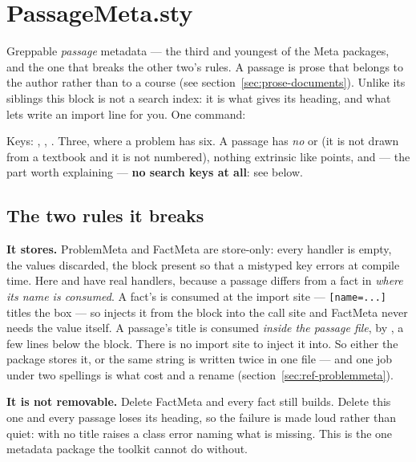 \section{PassageMeta.sty}\label{sec:ref-passagemeta}

Greppable \emph{passage} metadata --- the third and youngest of the Meta
packages, and the one that breaks the other two's rules. A passage is prose that
belongs to the author rather than to a course (see
section~\ref{sec:prose-documents}). Unlike its siblings this block is not a
search index: it is what gives  its heading, and what lets
 write an import line for you. One command:

\begin{manexsource}
\PassageTitle
\end{manexsource}

Keys: , , . Three, where a problem has six.
A passage has \emph{no}  or  (it is not drawn from a
textbook and it is not numbered), nothing extrinsic like points, and --- the part
worth explaining --- \textbf{no search keys at all}: see below.

\subsection*{The two rules it breaks}

\textbf{It stores.} ProblemMeta and FactMeta are store-only: every handler is
empty, the values discarded, the block present so that a mistyped key errors at
compile time. Here  and  have real handlers, because a
passage differs from a fact in \emph{where its name is consumed}. A fact's
 is consumed at the import site --- \texttt{[name=...]}
titles the box --- so  injects it from the block into the call
site and FactMeta never needs the value itself. A passage's title is consumed
\emph{inside the passage file}, by , a few lines below the
block. There is no import site to inject it into. So either the package stores
it, or the same string is written twice in one file --- and one job under two
spellings is what cost  and  a rename
(section~\ref{sec:ref-problemmeta}).

\textbf{It is not removable.} Delete FactMeta and every fact still builds.
Delete this one and every passage loses its heading, so the failure is made loud
rather than quiet:  with no title raises a class error naming
what is missing. This is the one metadata package the toolkit cannot do without.

